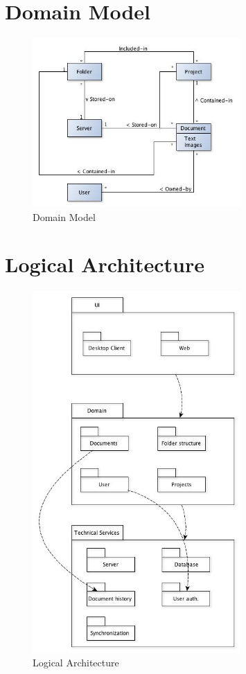 \documentclass[11pt,a4paper]{article}
\begin{document}
\section{Domain Model}
	\begin{figure}[h]
  		\centering
    	\includegraphics[width=300px]{images/DomainModel.jpg}
    	\caption{Domain Model}
	\end{figure}
	
\section{Logical Architecture}
	\begin{figure}[H]
  		\centering
    	\includegraphics[width=300px]{images/LogicalArchitecture.jpg}
    	\caption{Logical Architecture}
	\end{figure}
\end{document}

